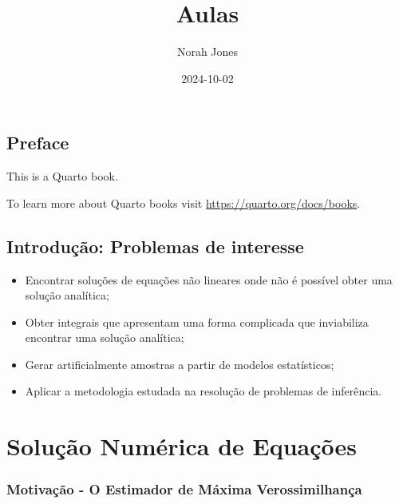 \documentclass[
  letterpaper,
  DIV=11,
  numbers=noendperiod]{scrreprt}
\title{Aulas}
\author{Norah Jones}
\date{2024-10-02}
\renewcommand*\contentsname{Índice}
\newcommand\contentsname{Índice}
\begin{document}
\maketitle

\renewcommand*\contentsname{Índice}
{
\hypersetup{linkcolor=}
\setcounter{tocdepth}{2}
\tableofcontents
}

\chapter*{Preface}\label{preface}


This is a Quarto book.

To learn more about Quarto books visit
\url{https://quarto.org/docs/books}.


\chapter{Introdução: Problemas de
interesse}\label{introduuxe7uxe3o-problemas-de-interesse}

\begin{itemize}
\item
  Encontrar soluções de equações não lineares onde não é possível obter
  uma solução analítica;
\item
  Obter integrais que apresentam uma forma complicada que inviabiliza
  encontrar uma solução analítica;
\item
  Gerar artificialmente amostras a partir de modelos estatísticos;
\item
  Aplicar a metodologia estudada na resolução de problemas de
  inferência.
\end{itemize}

\part{Solução Numérica de Equações}

\section*{Motivação - O Estimador de Máxima
Verossimilhança}\label{motivauxe7uxe3o---o-estimador-de-muxe1xima-verossimilhanuxe7a}
\end{document}

